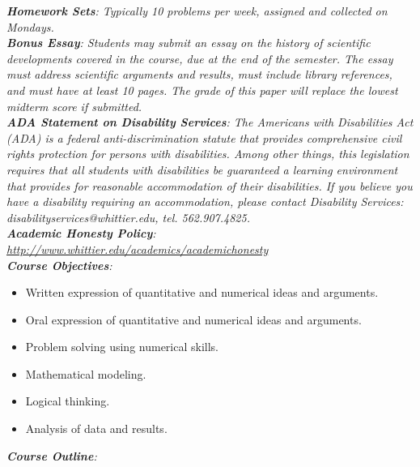 \documentclass[10pt]{article}
\begin{document}
\textit{\textbf{Homework Sets}: Typically 10 problems per week, assigned and collected on Mondays.} \\
\textit{\textbf{Bonus Essay}: Students may submit an essay on the history of scientific developments covered in the course, due at the end of the semester.  The essay must address scientific arguments and results, must include library references, and must have at least 10 pages.  The grade of this paper will replace the lowest midterm score if submitted.} \\
\textit{\textbf{ADA Statement on Disability Services}: The Americans with Disabilities Act (ADA) is a federal anti-discrimination statute that provides comprehensive civil rights protection for persons with disabilities. Among other things, this legislation requires that all students with disabilities be guaranteed a learning environment that provides for reasonable accommodation of their disabilities. If you believe you have a disability requiring an accommodation, please contact Disability Services: disabilityservices@whittier.edu, tel. 562.907.4825.} \\
\textit{\textbf{Academic Honesty Policy}: \url{http://www.whittier.edu/academics/academichonesty}} \\
\textit{\textbf{Course Objectives}:}
\begin{itemize}
\item Written expression of quantitative and numerical ideas and arguments.
\item Oral expression of quantitative and numerical ideas and arguments.
\item Problem solving using numerical skills.
\item Mathematical modeling.
\item Logical thinking.
\item Analysis of data and results.
\end{itemize}
\clearpage
\small
\textit{\textbf{Course Outline}:}
\end{document}
